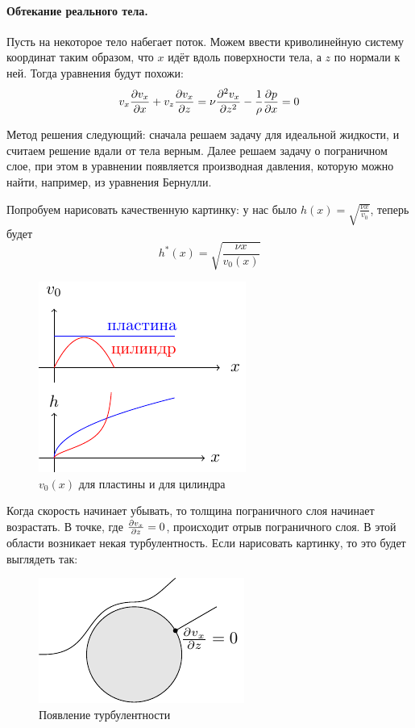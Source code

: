 \newpage
\paragraph{Обтекание реального тела. } Пусть на некоторое тело набегает поток. Можем ввести криволинейную систему координат таким образом, что $x$ идёт вдоль поверхности тела, а $z$ по нормали  к ней. Тогда уравнения будут похожи:
\begin{equation}
    v_x \pdv{v_x}{x}+ v_z \pdv{v_x}{z}= \nu \pdv[2]{v_x}{z}- \frac{1}{\rho}\pdv{p}{x}=0
\end{equation}

Метод решения следующий: сначала решаем задачу для идеальной жидкости, и считаем решение вдали от тела верным. Далее решаем задачу о пограничном слое, при этом в уравнении появляется производная давления,
которую можно найти, например, из уравнения Бернулли.

Попробуем нарисовать качественную картинку: у нас было $h(x)=\sqrt{\frac{\nu x}{v_0}}$, теперь будет 
\begin{equation}
    h^*(x) = \sqrt{\frac{\nu x}{v_0 (x)}}
\end{equation}
\begin{figure}[H]
    \centering
    \includegraphics[scale=1.5]{img/v0pl}
    \caption{$v_0(x)$ для пластины и для цилиндра}
    \label{fig:figure1}
\end{figure}
Когда скорость начинает убывать, то толщина пограничного слоя начинает 
возрастать. В точке, где $\pdv{v_x}{z}=0$, происходит отрыв пограничного
 слоя. В этой области возникает некая турбулентность. Если нарисовать картинку, то это будет выглядеть так:
\begin{figure}[H]
    \centering
    \includegraphics[scale=1.5]{img/turb}
    \caption{Появление турбулентности}
    \label{fig:figure1}
\end{figure}

